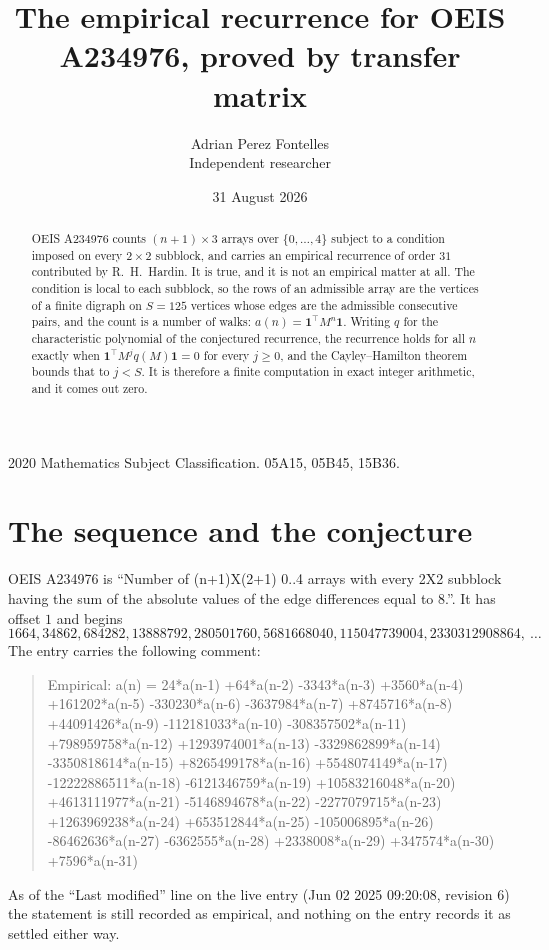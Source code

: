 \documentclass[11pt,a4paper]{article}
\title{The empirical recurrence for OEIS A234976, proved by transfer matrix}
\author{Adrian Perez Fontelles\\ \small Independent researcher}
\date{31 August 2026}
\theoremstyle{plain}
\theoremstyle{definition}
\begin{document}
\maketitle

\begin{abstract}
OEIS A234976 counts $(n+1)\times3$ arrays over $\{0,\dots,4\}$ subject to a condition imposed on
every $2\times2$ subblock, and carries an empirical recurrence of order $31$ contributed
by R.~H.~Hardin. It is true, and it is not an empirical matter at all. The condition is local
to each subblock, so the rows of an admissible array are the vertices of a finite digraph
on $S=125$ vertices whose edges are the admissible consecutive pairs, and the count is a
number of walks: $a(n)=\mathbf{1}^{\!\top}M^{n}\mathbf{1}$. Writing $q$
for the characteristic polynomial of the conjectured recurrence, the recurrence holds for all
$n$ exactly when $\mathbf{1}^{\!\top}M^{j}q(M)\mathbf{1}=0$ for every $j\ge0$, and the
Cayley--Hamilton theorem bounds that to $j<S$. It is therefore a finite computation in exact
integer arithmetic, and it comes out zero.
\end{abstract}

\noindent\small 2020 Mathematics Subject Classification. 05A15, 05B45, 15B36.\normalsize

\section{The sequence and the conjecture}

OEIS A234976 is ``Number of (n+1)X(2+1) 0..4 arrays with every 2X2 subblock having the sum of the absolute values of the edge differences equal to 8.''. It has offset $1$ and begins
\[
1664, 34862, 684282, 13888792, 280501760, 5681668040, 115047739004, 2330312908864,\ \dots
\]
The entry carries the following comment:
\begin{quote}\small
Empirical: a(n) = 24*a(n-1) +64*a(n-2) -3343*a(n-3) +3560*a(n-4) +161202*a(n-5) -330230*a(n-6) -3637984*a(n-7) +8745716*a(n-8) +44091426*a(n-9) -112181033*a(n-10) -308357502*a(n-11) +798959758*a(n-12) +1293974001*a(n-13) -3329862899*a(n-14) -3350818614*a(n-15) +8265499178*a(n-16) +5548074149*a(n-17) -12222886511*a(n-18) -6121346759*a(n-19) +10583216048*a(n-20) +4613111977*a(n-21) -5146894678*a(n-22) -2277079715*a(n-23) +1263969238*a(n-24) +653512844*a(n-25) -105006895*a(n-26) -86462636*a(n-27) -6362555*a(n-28) +2338008*a(n-29) +347574*a(n-30) +7596*a(n-31)
\end{quote}
As of the ``Last modified'' line on the live entry (Jun 02 2025 09:20:08, revision 6) the statement is
still recorded as empirical, and nothing on the entry records it as settled either way.
\end{document}
